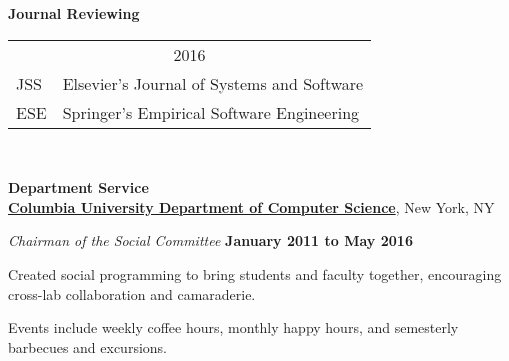 \documentclass[10pt]{article}
\begin{document}

\textbf{Journal Reviewing} \\
\vspace{-10pt}
\noindent\begin{tabular}{p{3cm}p{9.5cm}}
\multicolumn{2}{c}{2016}\\
JSS&Elsevier's Journal of Systems and Software\\
ESE&Springer's Empirical Software Engineering\\
\end{tabular}\\
\vspace{10pt}


\vspace{15pt}
\textbf{Department Service}\\
\href{http://www.cs.columbia.edu/}{\textbf{Columbia University Department of Computer Science}}, New York, NY
\vspace{6pt}
\begin{outerlist}
\item[] \textit{Chairman of the Social Committee}
        \hfill \textbf{January 2011 to May 2016}
        \vspace{-6pt}
        \begin{innerlist}
\item Created social programming to bring students and faculty together, encouraging cross-lab collaboration and camaraderie.
\item Events include weekly coffee hours, monthly happy hours, and semesterly barbecues and excursions.
\end{innerlist}
\end{outerlist}
\vspace{15pt}
\end{document}

